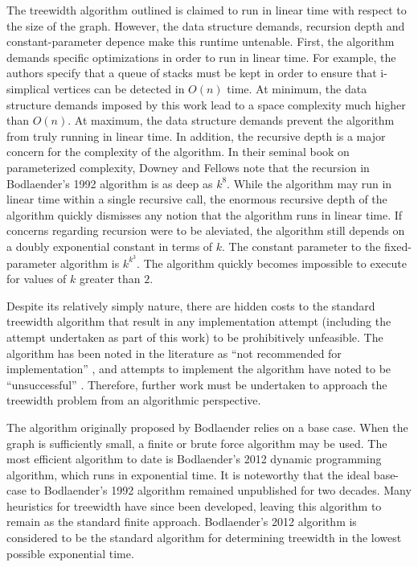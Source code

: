 \documentclass[12pt,conference]{IEEEtran}
\theoremstyle{plain}
\begin{document}
The treewidth algorithm outlined is claimed to run in linear time with respect to the size of the graph. However, the data structure demands, recursion depth and constant-parameter depence make this runtime untenable. First, the algorithm demands specific optimizations in order to run in linear time. For example, the authors specify that a queue of stacks must be kept in order to ensure that i-simplical vertices can be detected in $O(n)$ time. At minimum, the data structure demands imposed by this work lead to a space complexity much higher than $O(n)$. At maximum, the data structure demands prevent the algorithm from truly running in linear time. In addition, the recursive depth is a major concern for the complexity of the algorithm. In their seminal book on parameterized complexity, Downey and Fellows note that the recursion in Bodlaender's 1992 algorithm is as deep as $k^{8}$. While the algorithm may run in linear time within a single recursive call, the enormous recursive depth of the algorithm quickly dismisses any notion that the algorithm runs in linear time. If concerns regarding recursion were to be aleviated, the algorithm still depends on a doubly exponential constant in terms of $k$. The constant parameter to the fixed-parameter algorithm is $k^{k^{3}}$. The algorithm quickly becomes impossible to execute for values of $k$ greater than $2$.

Despite its relatively simply nature, there are hidden costs to the standard treewidth algorithm that result in any implementation attempt (including the attempt undertaken as part of this work) to be prohibitively unfeasible. The algorithm has been noted in the literature as ``not recommended for implementation'' \cite{bodlaender-not-recommended}, and attempts to implement the algorithm have noted to be ``unsuccessful'' \cite{bodlaender-unsuccessful}. Therefore, further work must be undertaken to approach the treewidth problem from an algorithmic perspective. 

The algorithm originally proposed by Bodlaender relies on a base case. When the graph is sufficiently small, a finite or brute force algorithm may be used. The most efficient algorithm to date is Bodlaender's 2012 dynamic programming algorithm, which runs in exponential time. It is noteworthy that the ideal base-case to Bodlaender's 1992 algorithm remained unpublished for two decades. Many heuristics for treewidth have since been developed, leaving this algorithm to remain as the standard finite approach. Bodlaender's 2012 algorithm is considered to be the standard algorithm for determining treewidth in the lowest possible exponential time.
\end{document}
